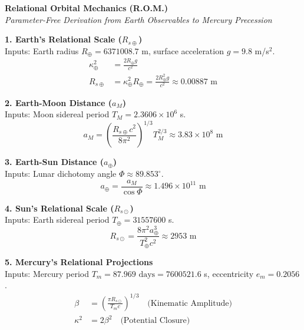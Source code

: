 \documentclass[11pt, a4paper]{article}
\begin{document}
\begin{center}
\Large \textbf{Relational Orbital Mechanics (R.O.M.)} \\
\normalsize \textit{Parameter-Free Derivation from Earth Observables to Mercury Precession}
\end{center}
\vspace{0.5cm}

\noindent \textbf{1. Earth's Relational Scale ($R_{s\oplus}$)} \\
Inputs: Earth radius $R_\oplus = 6371008.7$ m, surface acceleration $g = 9.8$ m/s$^2$.
\begin{align}
    \kappa_\oplus^2 &= \frac{2 R_\oplus g}{c^2} \\
    R_{s\oplus} &= \kappa_\oplus^2 R_\oplus = \frac{2 R_\oplus^2 g}{c^2} \approx 0.00887 \text{ m}
\end{align}

\noindent \textbf{2. Earth-Moon Distance ($a_M$)} \\
Inputs: Moon sidereal period $T_M = 2.3606 \times 10^6$ s. 
\begin{equation}
    a_M = \left( \frac{R_{s\oplus} c^2}{8\pi^2} \right)^{1/3} T_M^{2/3} \approx 3.83 \times 10^8 \text{ m}
\end{equation}

\noindent \textbf{3. Earth-Sun Distance ($a_\oplus$)} \\
Inputs: Lunar dichotomy angle $\Phi \approx 89.853^\circ$.
\begin{equation}
    a_\oplus = \frac{a_M}{\cos \Phi} \approx 1.496 \times 10^{11} \text{ m}
\end{equation}

\noindent \textbf{4. Sun's Relational Scale ($R_{s\odot}$)} \\
Inputs: Earth sidereal period $T_\oplus = 31557600$ s.
\begin{equation}
    R_{s\odot} = \frac{8\pi^2 a_\oplus^3}{T_\oplus^2 c^2} \approx 2953 \text{ m}
\end{equation}

\noindent \textbf{5. Mercury's Relational Projections} \\
Inputs: Mercury period $T_m = 87.969 \text{ days} = 7600521.6$ s, eccentricity $e_m = 0.2056$.
\begin{align}
    \beta &= \left( \frac{\pi R_{s\odot}}{T_m c} \right)^{1/3} \quad \text{(Kinematic Amplitude)} \\
    \kappa^2 &= 2\beta^2 \quad \text{(Potential Closure)}
\end{align}
\end{document}
